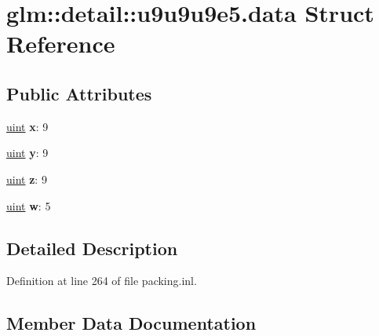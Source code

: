 \hypertarget{structglm_1_1detail_1_1u9u9u9e5_8data}{}\section{glm\+:\+:detail\+:\+:u9u9u9e5.\+data Struct Reference}
\label{structglm_1_1detail_1_1u9u9u9e5_8data}
\subsection*{Public Attributes}
\begin{DoxyCompactItemize}
\item 
\mbox{\label{structglm_1_1detail_1_1u9u9u9e5_8data_a9dd4e461268c8034f5c8564e155c67a6}} 
\hyperlink{group__core__precision_ga4fd29415871152bfb5abd588334147c8}{uint} {\bfseries x}\+: 9
\item 
\mbox{\label{structglm_1_1detail_1_1u9u9u9e5_8data_a415290769594460e2e485922904f345d}} 
\hyperlink{group__core__precision_ga4fd29415871152bfb5abd588334147c8}{uint} {\bfseries y}\+: 9
\item 
\mbox{\label{structglm_1_1detail_1_1u9u9u9e5_8data_afbade9e36a3f36d3d676c1b808451dd7}} 
\hyperlink{group__core__precision_ga4fd29415871152bfb5abd588334147c8}{uint} {\bfseries z}\+: 9
\item 
\mbox{\label{structglm_1_1detail_1_1u9u9u9e5_8data_af1290186a5d0b1ceab27f4e77c0c5d68}} 
\hyperlink{group__core__precision_ga4fd29415871152bfb5abd588334147c8}{uint} {\bfseries w}\+: 5
\end{DoxyCompactItemize}


\subsection{Detailed Description}


Definition at line 264 of file packing.\+inl.



\subsection{Member Data Documentation}
\mbox{\label{structglm_1_1detail_1_1u9u9u9e5_8data_af1290186a5d0b1ceab27f4e77c0c5d68}} 
